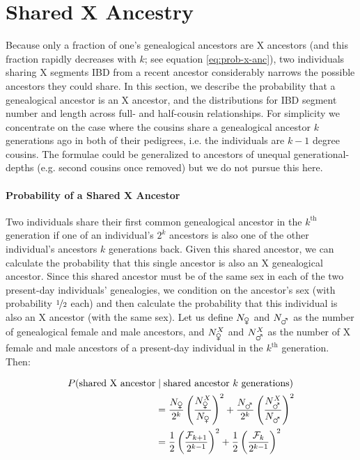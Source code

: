 \documentclass[9pt,twocolumn,twoside]{gsajnl}
\begin{document}
\section*{Shared X Ancestry}
\label{sec:shared-x-anc}

Because only a fraction of one's genealogical ancestors are X ancestors (and
this fraction rapidly decreases with $k$; see equation \eqref{eq:prob-x-anc}),
two individuals sharing X segments IBD from a recent ancestor considerably
narrows the possible ancestors they could share. In this section, we describe
the probability that a genealogical ancestor is an X ancestor, and the
distributions for IBD segment number and length across full- and half-cousin
relationships. For simplicity we concentrate on the case where the cousins
share a genealogical ancestor $k$ generations ago in both of their pedigrees,
i.e. the individuals are $k-1$ degree cousins. The formulae could be
generalized to ancestors of unequal generational-depths (e.g. second cousins
once removed) but we do not pursue this here.

\paragraph{Probability of a Shared X Ancestor} 

Two individuals share their first common genealogical ancestor in the
$k^\text{th}$ generation if one of an individual's $2^k$ ancestors is also one
of the other individual's ancestors $k$ generations back. Given this shared
ancestor, we can calculate the probability that this single ancestor is also an
X genealogical ancestor. Since this shared ancestor must be of the same sex in
each of the two present-day individuals' genealogies, we condition on the
ancestor's sex (with probability $\nicefrac{1}{2}$ each) and then calculate the
probability that this individual is also an X ancestor (with the same sex). Let
us define $N_{\venus}$ and $N_{\mars}$ as the number of genealogical female and
male ancestors, and $N_{\venus}^X$ and $N_{\mars}^X$ as the number of X female
and male ancestors of a present-day individual in the $k^\text{th}$ generation.
Then:

\begin{align}
  P(\text{shared X ancestor} & \; | \; \text{shared ancestor } k \text{ generations}) \\ \nonumber
  &= \frac{N_{\venus}}{2^k}\left(\frac{N_{\venus}^X}{N_{\venus}}\right)^2 + 
  \frac{N_{\mars}}{2^k}\left(\frac{N_{\mars}^X}{N_{\mars}}\right)^2 \nonumber \\
  &= \frac{1}{2}\left(\frac{\mathcal{F}_{k+1}}{2^{k-1}}\right)^2 + \frac{1}{2}\left(\frac{\mathcal{F}_k}{2^{k-1}}\right)^2
  \label{eq:prob-shared-x-ancestor}
\end{align}
\end{document}
